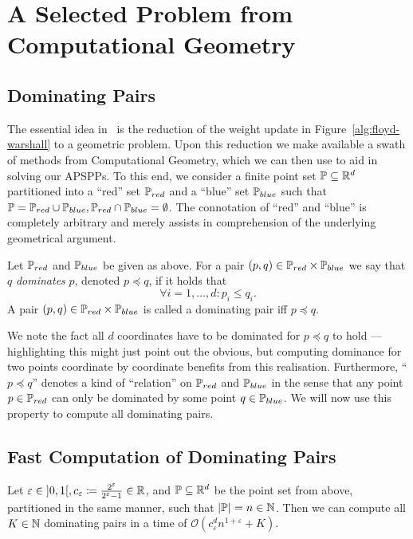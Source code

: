\chapter{A Selected Problem from Computational Geometry}\label{chap:computational-geometry}

\section{Dominating Pairs}

The essential idea in~\cite{Chan2007} is the reduction of the weight update in Figure~\ref{alg:floyd-warshall} to a geometric problem.
Upon this reduction we make available a swath of methods from Computational Geometry, which we can then use to aid in solving our APSPPs.
To this end, we consider a finite point set $\mathbb{P} \subseteq \mathbb{R}^d$ partitioned into a ``red'' set $\mathbb{P}_{red}$ and a ``blue'' set $\mathbb{P}_{blue}$ such that $\mathbb{P} = \mathbb{P}_{red} \cup \mathbb{P}_{blue}, \mathbb{P}_{red} \cap \mathbb{P}_{blue} = \emptyset$.
The connotation of ``red'' and ``blue'' is completely arbitrary and merely assists in comprehension of the underlying geometrical argument.

\begin{definition}
    Let $\mathbb{P}_{red}$ and $\mathbb{P}_{blue}$ be given as above. For a pair $(p, q) \in \mathbb{P}_{red} \times \mathbb{P}_{blue}$ we say that $q$ \emph{dominates} $p$, denoted $p \preccurlyeq q$, if it holds that
    \[
        \forall i = 1, \dots, d: p_i \leq q_i.
    \]
    A pair $(p, q) \in \mathbb{P}_{red} \times \mathbb{P}_{blue}$ is called a dominating pair iff $p \preccurlyeq q$.
\end{definition}

We note the fact all $d$ coordinates have to be dominated for $p \preccurlyeq q$ to hold --- highlighting this might just point out the obvious, but computing dominance for two points coordinate by coordinate benefits from this realisation.
Furthermore, ``$p \preccurlyeq q$'' denotes a kind of ``relation'' on $\mathbb{P}_{red}$ and $\mathbb{P}_{blue}$ in the sense that any point $p \in \mathbb{P}_{red}$ can only be dominated by some point $q \in \mathbb{P}_{blue}$.
We will now use this property to compute all dominating pairs.

\section{Fast Computation of Dominating Pairs}

\begin{lemma}\label{lem:dominating-pairs}
    Let $\varepsilon \in \interval[open]{0}{1}, c_\varepsilon \coloneqq \frac{2^\varepsilon}{2^\varepsilon - 1} \in \bb{R}$, and $\mathbb{P} \subseteq \mathbb{R}^d$ be the point set from above, partitioned in the same manner, such that $\left\lvert\mathbb{P}\right\rvert_{} = n \in \mathbb{N}$.
    Then we can compute all $K \in \mathbb{N}$ dominating pairs in a time of $\mathcal{O}\left( c_\varepsilon^d n^{1 + \varepsilon} + K \right)$.
\end{lemma}

